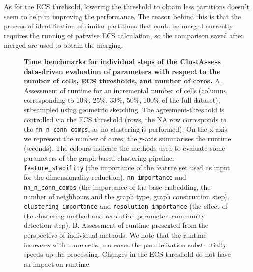 As for the ECS threhsold, lowering the threshold to obtain less partitions doesn't seem to help in improving the performance. The reason behind this is that the process of identification of similar partitions that could be merged currently requires the running of pairwise ECS calculation, so the comparison saved after merged are used to obtain the merging.


\begin{figure}[H]
    \centering
    \caption{\label{fig:pipeline-benchmark}\textbf{Time benchmarks for individual steps of the ClustAssess data-driven evaluation of parameters with respect to the number of cells, ECS thresholds, and number of cores.}
A. Assessment of runtime for an incremental number of cells (columns, corresponding to 10\%, 25\%, 33\%, 50\%, 100\% of the full dataset), subsampled using geometric sketching. The agreement-threshold is controlled via the ECS threshold (rows, the NA row corresponds to the \texttt{nn\_n\_conn\_comps}, as no clustering is performed). On the x-axis we represent the number of cores; the y-axis summarises the runtime (seconds). The colours indicate the methods used to evaluate some parameters of the graph-based clustering pipeline: \texttt{feature\_stability} (the importance of the feature set used as input for the dimensionality reduction), \texttt{nn\_importance} and \texttt{nn\_n\_conn\_comps} (the importance of the base embedding, the number of neighbours and the graph type, graph construction step), \texttt{clustering\_importance} and \texttt{resolution\_importance} (the effect of the clustering method and resolution parameter, community detection step). 
B. Assessment of runtime presented from the perspective of individual methods. We note that the 
runtime increases with more cells; moreover the parallelisation substantially speeds up the processing. Changes in the ECS threshold do not have an impact on runtime.}


\end{figure}
